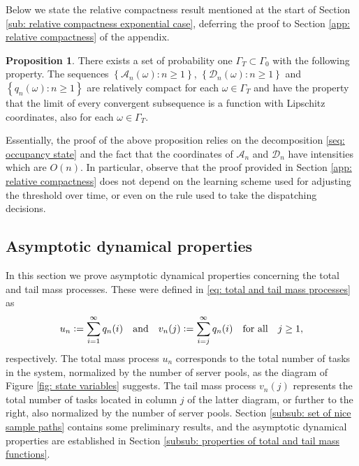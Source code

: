 \documentclass[a4paper, 12pt]{article}
\theoremstyle{definition}
\newtheorem{proposition}[theorem]{Proposition}
\newcommand{\set}[2]{\left\{#1 : #2\right\}}
\newcommand{\defeq}{\vcentcolon=}
\newcommand{\calA}{\mathcal{A}}
\newcommand{\calD}{\mathcal{D}}
\begin{document}
Below we state the relative compactness result mentioned at the start of Section \ref{sub: relative compactness exponential case}, deferring the proof to Section \ref{app: relative compactness} of the appendix.

\begin{proposition}
	\label{prop: relative compactness of occupancy state sample paths}
	There exists a set of probability one $\Gamma_T \subset \Gamma_0$ with the following property. The sequences $\set{\calA_n(\omega)}{n \geq 1}$, $\set{\calD_n(\omega)}{n \geq 1}$ and $\set{q_n(\omega)}{n \geq 1}$ are relatively compact for each $\omega \in \Gamma_T$ and have the property that the limit of every convergent subsequence is a function with Lipschitz coordinates, also for each $\omega \in \Gamma_T$. 
\end{proposition}

Essentially, the proof of the above proposition relies on the decomposition \eqref{seq: occupancy state} and the fact that the coordinates of $\calA_n$ and $\calD_n$ have intensities which are $O(n)$. In particular, observe that the proof provided in Section \ref{app: relative compactness} does not depend on the learning scheme used for adjusting the threshold over time, or even on the rule used to take the dispatching decisions.

\subsection{Asymptotic dynamical properties}
\label{sub: asymptotic dynamical properties exponential case}

In this section we prove asymptotic dynamical properties concerning the total and tail mass processes. These were defined in \eqref{eq: total and tail mass processes} as
\begin{equation*}
	u_n \defeq \sum_{i = 1}^\infty q_n(i) \quad \text{and} \quad v_n(j) \defeq \sum_{i = j}^\infty q_n(i) \quad \text{for all} \quad j \geq 1,
\end{equation*}
respectively. The total mass process $u_n$ corresponds to the total number of tasks in the system, normalized by the number of server pools, as the diagram of Figure \ref{fig: state variables} suggests. The tail mass process $v_n(j)$ represents the total number of tasks located in column $j$ of the latter diagram, or further to the right, also normalized by the number of server pools. Section \ref{subsub: set of nice sample paths} contains some preliminary results, and the asymptotic dynamical properties are established in Section \ref{subsub: properties of total and tail mass functions}.
\end{document}
